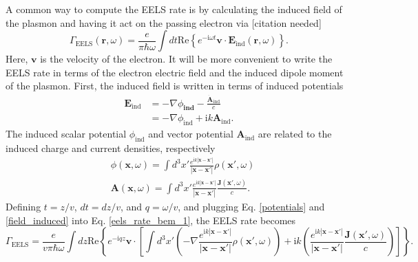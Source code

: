 \documentclass [11pt, proquest] {uwthesis}[2016/11/22]
\begin{document}
A common way to compute the EELS rate is by calculating the induced field of the plasmon and having it act on the passing electron via [citation needed]
\begin{equation}
\Gamma_{\textrm{EELS}}(\textbf{r},\omega) = \frac{e}{\pi\hbar\omega}\int dt \textrm{Re}\left\{ e^{-\textrm{i}\omega t} \textbf{v} \cdot \textbf{E}_{\textrm{ind}}(\textbf{r},\omega)\right\}.
\label{eels_rate_bem_1}
\end{equation}
Here, $\textbf{v}$ is the velocity of the electron. It will be more convenient to write the EELS rate in terms of the electron electric field and the induced dipole moment of the plasmon. First, the induced field is written in terms of induced potentials
\begin{equation}
\begin{aligned}
\textbf{E}_{\textrm{ind}} &= -\nabla\phi_{\textbf{ind}} - \frac{\dot{\textbf{A}}_{\textrm{ind}}}{c}\\
&= -\nabla\phi_{\textrm{ind}} + \textrm{i}k\textbf{A}_{\textrm{ind}}.
\label{field_induced}
\end{aligned}
\end{equation}
The induced scalar potential $\phi_{\textrm{ind}}$ and vector potential $\textbf{A}_{\textrm{ind}}$ are related to the induced charge and current densities, respectively
\begin{equation}
\begin{aligned}
&\phi(\textbf{x},\omega) = \int d^3x' \frac{e^{\textrm{i}k|\textbf{x}-\textbf{x}'|}}{|\textbf{x}-\textbf{x}'|}\rho(\textbf{x}',\omega)\\
&\textbf{A}(\textbf{x},\omega) = \int d^3x' \frac{e^{\textrm{i}k|\textbf{x}-\textbf{x}'|}}{|\textbf{x}-\textbf{x}'|}\frac{\textbf{J}(\textbf{x}',\omega)}{c}.
\label{potentials}
\end{aligned}
\end{equation}
Defining $t = z/v$, $dt = dz/v$, and $q = \omega/v$, and plugging Eq. \ref{potentials} and \ref{field_induced} into Eq. \ref{eels_rate_bem_1}, the EELS rate becomes
\begin{equation}
\Gamma_{\textrm{EELS}} = \frac{e}{v\pi\hbar\omega}\int dz \textrm{Re}\left\{ e^{-\textrm{i}qz} \textbf{v} \cdot \left[\int d^3x' \left(-\nabla\frac{e^{\textrm{i}k|\textbf{x}-\textbf{x}'|}}{|\textbf{x}-\textbf{x}'|}\rho(\textbf{x}',\omega)\right) + \textrm{i}k\left(\frac{e^{\textrm{i}k|\textbf{x}-\textbf{x}'|}}{|\textbf{x}-\textbf{x}'|}\frac{\textbf{J}(\textbf{x}',\omega)}{c}\right)\right]\right\}.
\label{eels_with_potentials}
\end{equation}
\end{document}
